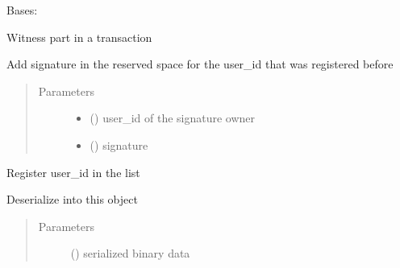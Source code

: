 \documentclass[letterpaper,10pt,english]{sphinxmanual}
\begin{document}
\begin{fulllineitems}
\label{\detokenize{bbc1.core.bbclib:bbc1.core.bbclib.BBcWitness}}
Bases: 

Witness part in a transaction

\begin{fulllineitems}
\label{\detokenize{bbc1.core.bbclib:bbc1.core.bbclib.BBcWitness.add_signature}}
Add signature in the reserved space for the user\_id that was registered before
\begin{quote}\begin{description}
\item[{Parameters}] \leavevmode\begin{itemize}
\item {} 
 () \textendash{} user\_id of the signature owner

\item {} 
 () \textendash{} signature

\end{itemize}

\end{description}\end{quote}

\end{fulllineitems}


\begin{fulllineitems}
\label{\detokenize{bbc1.core.bbclib:bbc1.core.bbclib.BBcWitness.add_witness}}
Register user\_id in the list

\end{fulllineitems}


\begin{fulllineitems}
\label{\detokenize{bbc1.core.bbclib:bbc1.core.bbclib.BBcWitness.deserialize}}
Deserialize into this object
\begin{quote}\begin{description}
\item[{Parameters}] \leavevmode
{} () \textendash{} serialized binary data


\end{description}
\end{quote}
\end{fulllineitems}
\end{fulllineitems}
\end{document}
